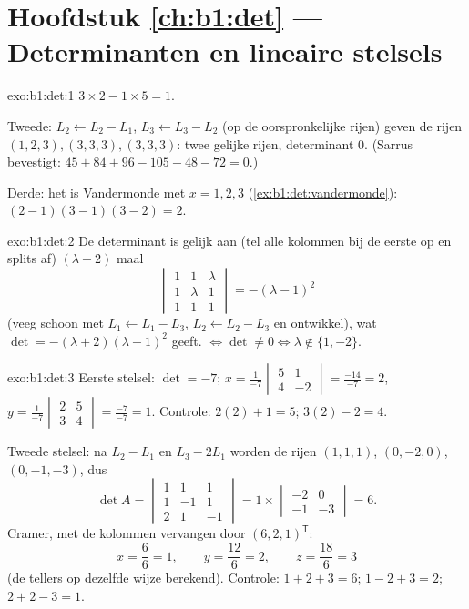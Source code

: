 \section*{Hoofdstuk \ref{ch:b1:det} --- Determinanten en lineaire
stelsels}

\begin{solution}{exo:b1:det:1}
$3 \times 2 - 1 \times 5 = 1$.

Tweede: $L_2 \leftarrow L_2 - L_1$, $L_3 \leftarrow L_3 - L_2$ (op
de oorspronkelijke rijen) geven de rijen $(1,2,3), (3,3,3),
(3,3,3)$: twee gelijke rijen, determinant $0$. (Sarrus bevestigt:
$45 + 84 + 96 - 105 - 48 - 72 = 0$.)

Derde: het is Vandermonde met $x = 1, 2, 3$
(\cref{ex:b1:det:vandermonde}): $(2-1)(3-1)(3-2) = 2$.
\end{solution}

\begin{solution}{exo:b1:det:2}
De determinant is gelijk aan (tel alle kolommen bij de eerste op en
splits af) $(\lambda + 2)$ maal
\[
\begin{vmatrix}
1 & 1 & \lambda\\ 1 & \lambda & 1\\ 1 & 1 & 1
\end{vmatrix}
= -(\lambda - 1)^2
\]
(veeg schoon met $L_1 \leftarrow L_1 - L_3$, $L_2 \leftarrow L_2 -
L_3$ en ontwikkel), wat $\det = -(\lambda+2)(\lambda-1)^2$ geeft.
 $\iff \det \neq 0 \iff \lambda \notin \{1, -2\}$.
\end{solution}

\begin{solution}{exo:b1:det:3}
Eerste stelsel: $\det = -7$;
$x = \frac{1}{-7}\begin{vmatrix} 5 & 1\\ 4 & -2\end{vmatrix}
= \frac{-14}{-7} = 2$,
$y = \frac{1}{-7}\begin{vmatrix} 2 & 5\\ 3 & 4\end{vmatrix}
= \frac{-7}{-7} = 1$. Controle: $2(2) + 1 = 5$; $3(2) - 2 = 4$.

Tweede stelsel: na $L_2 - L_1$ en $L_3 - 2L_1$ worden de rijen
$(1,1,1)$, $(0,-2,0)$, $(0,-1,-3)$, dus
\[
\det A = \begin{vmatrix} 1&1&1\\ 1&-1&1\\ 2&1&-1\end{vmatrix}
= 1 \times \begin{vmatrix} -2 & 0\\ -1 & -3\end{vmatrix} = 6 .
\]
Cramer, met de kolommen vervangen door $(6,2,1)^{\mathsf T}$:
\[
x = \frac{6}{6} = 1, \qquad
y = \frac{12}{6} = 2, \qquad
z = \frac{18}{6} = 3
\]
(de tellers op dezelfde wijze berekend). Controle: $1 + 2 + 3 = 6$;
$1 - 2 + 3 = 2$; $2 + 2 - 3 = 1$.
\end{solution}

